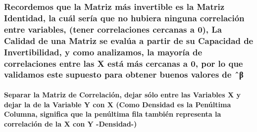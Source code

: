 \documentclass[11pt]{article}
\begin{document}
    \subsubsection{Recordemos que la Matriz más invertible es la Matriz
Identidad, la cuál sería que no hubiera ninguna correlación entre
variables, (tener correlaciones cercanas a 0), La Calidad de una Matriz
se evalúa a partir de su Capacidad de Invertibilidad, y como analizamos,
la mayoría de correlaciones entre las X está más cercanas a 0, por lo
que validamos este supuesto para obtener buenos valores de
ˆβ}\label{recordemos-que-la-matriz-muxe1s-invertible-es-la-matriz-identidad-la-cuuxe1l-seruxeda-que-no-hubiera-ninguna-correlaciuxf3n-entre-variables-tener-correlaciones-cercanas-a-0-la-calidad-de-una-matriz-se-evaluxfaa-a-partir-de-su-capacidad-de-invertibilidad-y-como-analizamos-la-mayoruxeda-de-correlaciones-entre-las-x-estuxe1-muxe1s-cercanas-a-0-por-lo-que-validamos-este-supuesto-para-obtener-buenos-valores-de-ux2c6ux3b2}


    \paragraph{Separar la Matriz de Correlación, dejar sólo entre las
Variables X y dejar la de la Variable Y con X (Como Densidad es la
Penúltima Columna, significa que la penúltima fila también representa la
correlación de la X con Y
-Densidad-)}\label{separar-la-matriz-de-correlaciuxf3n-dejar-suxf3lo-entre-las-variables-x-y-dejar-la-de-la-variable-y-con-x-como-densidad-es-la-penuxfaltima-columna-significa-que-la-penuxfaltima-fila-tambiuxe9n-representa-la-correlaciuxf3n-de-la-x-con-y--densidad-}
\end{document}
